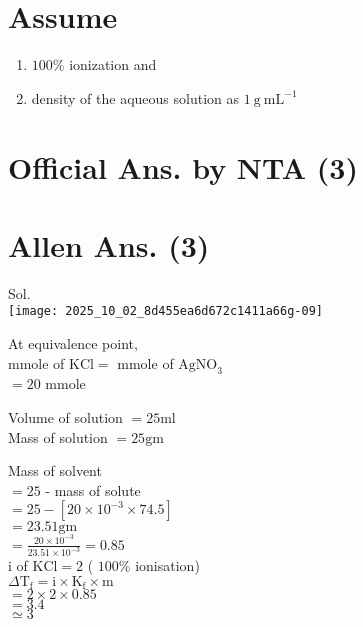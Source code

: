 \documentclass[10pt]{article}
\begin{document}
\section*{Assume}
\begin{enumerate}
  \item \(100 \%\) ionization and
  \item density of the aqueous solution as \(1 \mathrm{~g} \mathrm{~mL}^{-1}\)
\end{enumerate}

\section*{Official Ans. by NTA (3)}
\section*{Allen Ans. (3)}
Sol.\\
\texttt{[image: 2025\_10\_02\_8d455ea6d672c1411a66g-09]}

At equivalence point,\\
mmole of \(\mathrm{KCl}=\) mmole of \(\mathrm{AgNO}_{3}\)\\
\(=20\) mmole

Volume of solution \(=25 \mathrm{ml}\)\\
Mass of solution \(=25 \mathrm{gm}\)

Mass of solvent\\
\(=25\) - mass of solute\\
\(=25-\left[20 \times 10^{-3} \times 74.5\right]\)\\
\(=23.51 \mathrm{gm}\)\\
\(=\frac{20 \times 10^{-3}}{23.51 \times 10^{-3}}=0.85\)\\
i of \(\mathrm{KCl}=2\) ( \(100 \%\) ionisation)\\
\(\Delta \mathrm{T}_{\mathrm{f}}=\mathrm{i} \times \mathrm{K}_{\mathrm{f}} \times \mathrm{m}\)\\
\(=2 \times 2 \times 0.85\)\\
\(=3.4\)\\
\(\simeq 3\)
\end{document}
